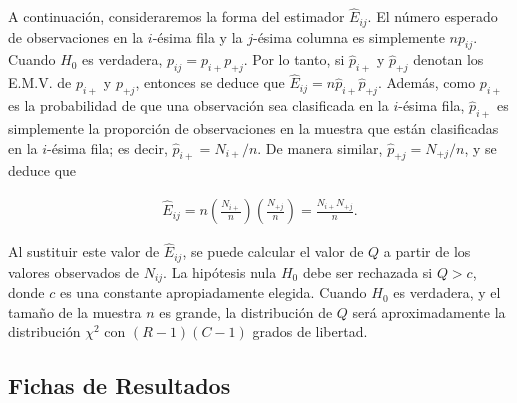 \documentclass{book}
\begin{document}
A continuación, consideraremos la forma del estimador $\hat{E}_{ij}$. El número esperado de observaciones en la $i$-ésima fila y la $j$-ésima columna es simplemente $np_{ij}$. Cuando $H_0$ es verdadera, $p_{ij} = p_{i+}p_{+j}$. Por lo tanto, si $\hat{p}_{i+}$ y $\hat{p}_{+j}$ denotan los E.M.V. de $p_{i+}$ y $p_{+j}$, entonces se deduce que $\hat{E}_{ij} = n\hat{p}_{i+}\hat{p}_{+j}$. Además, como $p_{i+}$ es la probabilidad de que una observación sea clasificada en la $i$-ésima fila, $\hat{p}_{i+}$ es simplemente la proporción de observaciones en la muestra que están clasificadas en la $i$-ésima fila; es decir, $\hat{p}_{i+} = N_{i+}/n$. De manera similar, $\hat{p}_{+j} = N_{+j}/n$, y se deduce que

\begin{align}
\hat{E}_{ij} = n\left(\frac{N_{i+}}{n}\right)\left(\frac{N_{+j}}{n}\right) = \frac{N_{i+}N_{+j}}{n}.
\end{align}

Al sustituir este valor de $\hat{E}_{ij}$, se puede calcular el valor de $Q$ a partir de los valores observados de $N_{ij}$. La hipótesis nula $H_0$ debe ser rechazada si $Q > c$, donde $c$ es una constante apropiadamente elegida. Cuando $H_0$ es verdadera, y el tamaño de la muestra $n$ es grande, la distribución de $Q$ será aproximadamente la distribución $\chi^2$ con $(R - 1)(C - 1)$ grados de libertad.

\subsection{Fichas de Resultados}




\nocite{*}
\end{document}
